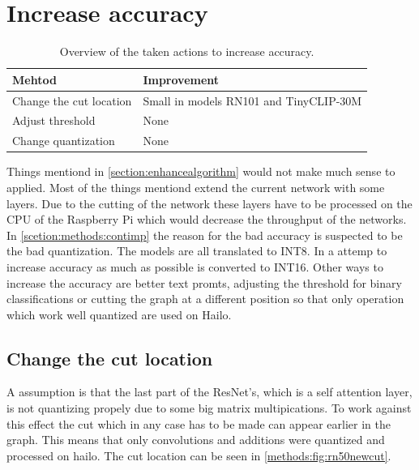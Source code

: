 \section{Increase accuracy}

\begin{table}[h!]
    \centering
    \begin{tabular}{l|l}
        \hline
     Mehtod &  Improvement\\
     \hline
     Change the cut location &  Small in models RN101 and TinyCLIP-30M\\
     Adjust threshold &  None\\
     Change quantization & None
    \end{tabular}
    \caption{Overview of the taken actions to increase accuracy.}
    \label{methods:tab:prefOverview}
\end{table}

Things mentiond in \cref{section:enhancealgorithm} would not make much sense to applied.
Most of the things mentiond extend the current network with some layers.
Due to the cutting of the network these layers have to be processed on the CPU of the Raspberry Pi which would decrease the throughput of the networks.
In \cref{scetion:methods:contimp} the reason for the bad accuracy is suspected to be the bad quantization.
The models are all translated to INT8.
In a attemp to increase accuracy as much as possible is converted to INT16.
Other ways to increase the accuracy are better text promts, adjusting the threshold for binary classifications or cutting the graph at a different position so that only operation which work well quantized are used on Hailo.

\subsection{Change the cut location
\label{methods:sec:cutlocation}}
A assumption is that the last part of the ResNet's, which is a self attention layer, is not quantizing propely due to some big matrix multipications.
To work against this effect the cut which in any case has to be made can appear earlier in the graph.
This means that only convolutions and additions were quantized and processed on hailo.
The cut location can be seen in \cref{methods:fig:rn50newcut}.

